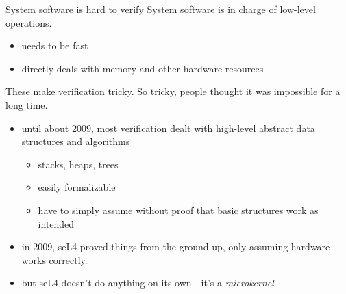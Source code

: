\documentclass{beamer}
\begin{document}
\begin{frame}{System software is hard to verify}
    System software is in charge of low-level operations.
    \begin{itemize}
        \item needs to be fast
        \item directly deals with memory and other hardware resources
    \end{itemize}
    These make verification tricky.
    So tricky, people thought it was impossible for a long time.
    \begin{itemize}
        \item until about 2009, most verification dealt with high-level abstract data structures and algorithms
        \begin{itemize}
            \item stacks, heaps, trees
            \item easily formalizable
            \item have to simply assume without proof that basic structures work as intended
        \end{itemize}
        \item in 2009, seL4 proved things from the ground up, only assuming hardware works correctly.
        \item but seL4 doesn't do anything on its own---it's a \textit{microkernel}.
    \end{itemize}
\end{frame}















    
\end{document}
